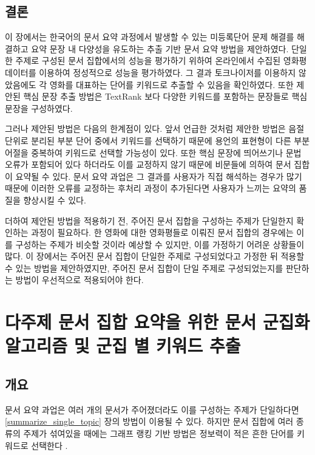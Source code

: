 \documentclass[oneside, ko,phd]{snuthesis_utf8_kor}
\begin{document}
\section{결론}

이 장에서는 한국어의 문서 요약 과정에서 발생할 수 있는 미등록단어 문제 해결를 해결하고 요약 문장 내 다양성을 유도하는 추출 기반 문서 요약 방법을 제안하였다.
단일한 주제로 구성된 문서 집합에서의 성능을 평가하기 위하여 온라인에서 수집된 영화평 데이터를 이용하여 정성적으로 성능을 평가하였다.
그 결과 토크나이저를 이용하지 않았음에도 각 영화를 대표하는 단어를 키워드로 추출할 수 있음을 확인하였다.
또한 제안된 핵심 문장 추출 방법은 TextRank 보다 다양한 키워드를 포함하는 문장들로 핵심 문장을 구성하였다.

그러나 제안된 방법은 다음의 한계점이 있다.
앞서 언급한 것처럼 제안한 방법은 음절 단위로 분리된 부분 단어 중에서 키워드를 선택하기 때문에 용언의 표현형이 다른 부분어절을 중복하여 키워드로 선택할 가능성이 있다.
또한 핵심 문장에 띄어쓰기나 문법 오류가 포함되어 있다 하더라도 이를 교정하지 않기 때문에 비문들에 의하여 문서 집합이 요약될 수 있다.
문서 요약 과업은 그 결과를 사용자가 직접 해석하는 경우가 많기 때문에 이러한 오류를 교정하는 후처리 과정이 추가된다면 사용자가 느끼는 요약의 품질을 향상시킬 수 있다.

더하여 제안된 방법을 적용하기 전, 주어진 문서 집합을 구성하는 주제가 단일한지 확인하는 과정이 필요하다.
한 영화에 대한 영화평들로 이뤄진 문서 집합의 경우에는 이를 구성하는 주제가 비슷할 것이라 예상할 수 있지만, 이를 가정하기 어려운 상황들이 많다.
이 장에서는 주어진 문서 집합이 단일한 주제로 구성되었다고 가정한 뒤 적용할 수 있는 방법을 제안하였지만, 주어진 문서 집합이 단일 주제로 구성되었는지를 판단하는 방법이 우선적으로 적용되어야 한다.

\newpage
\chapter{다주제 문서 집합 요약을 위한 문서 군집화 알고리즘 및 군집 별 키워드 추출} \label{improved_kmeans}

\section{개요}

문서 요약 과업은 여러 개의 문서가 주어졌더라도 이를 구성하는 주제가 단일하다면 \ref{summarize_single_topic} 장의 방법이 이용될 수 있다.
하지만 문서 집합에 여러 종류의 주제가 섞여있을 때에는 그래프 랭킹 기반 방법은 정보력이 적은 흔한 단어를 키워드로 선택한다 \cite{goldstein2000multi, lin2002single, filippova2008sentence, filippova2010multi}.
\end{document}
